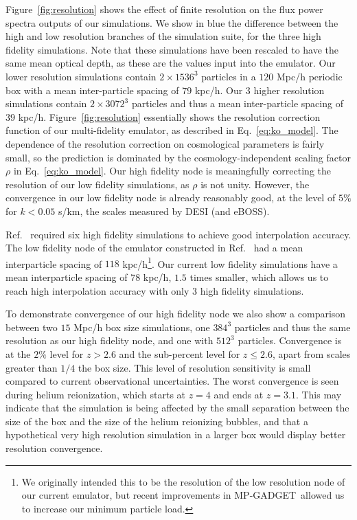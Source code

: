 \documentclass[a4paper,11pt]{article}
\newcommand{\mpgadget}{{\small MP-GADGET}}
\begin{document}
Figure~\ref{fig:resolution} shows the effect of finite resolution on the flux power spectra outputs of our simulations. We show in blue the difference between the high and low resolution branches of the simulation suite, for the three high fidelity simulations. Note that these simulations have been rescaled to have the same mean optical depth, as these are the values input into the emulator. Our lower resolution simulations contain $2\times 1536^3$ particles in a $120$ Mpc/h periodic box with a mean inter-particle spacing of $79$ kpc/h. Our $3$ higher resolution simulations contain $2\times 3072^3$ particles and thus a mean inter-particle spacing of $39$ kpc/h. Figure~\ref{fig:resolution} essentially shows the resolution correction function of our multi-fidelity emulator, as described in Eq.~\ref{eq:ko_model}. The dependence of the resolution correction on cosmological parameters is fairly small, so the prediction is dominated by the cosmology-independent scaling factor $\rho$ in Eq.~\ref{eq:ko_model}. Our high fidelity node is meaningfully correcting the resolution of our low fidelity simulations, as $\rho$ is not unity.
However, the convergence in our low fidelity node is already reasonably good, at the level of $5\%$ for $k < 0.05$ s/km, the scales measured by DESI (and eBOSS).

Ref.~\cite{Fernandez:2022} required six high fidelity simulations to achieve good interpolation accuracy. The low fidelity node of the emulator constructed in Ref.~\cite{Fernandez:2022} had a mean interparticle spacing of $118$ kpc/h\footnote{We originally intended this to be the resolution of the low resolution node of our current emulator, but recent improvements in \mpgadget~allowed us to increase our minimum particle load.}. Our current low fidelity simulations have a mean interparticle spacing of $78$ kpc/h, $1.5$ times smaller, which allows us to reach high interpolation accuracy with only $3$ high fidelity simulations.

To demonstrate convergence of our high fidelity node we also show a comparison between two $15$ Mpc/h box size simulations, one $384^3$ particles and thus the same resolution as our high fidelity node, and one with $512^3$ particles. Convergence is at the $2\%$ level for $z > 2.6$ and the sub-percent level for $z \leq 2.6$, apart from scales greater than $1/4$ the box size. This level of resolution sensitivity is small compared to current observational uncertainties.
The worst convergence is seen during helium reionization, which starts at $z=4$ and ends at $z=3.1$. This may indicate that the simulation is being affected by the small separation between the size of the box and the size of the helium reionizing bubbles, and that a hypothetical very high resolution simulation in a larger box would display better resolution convergence.
\end{document}
